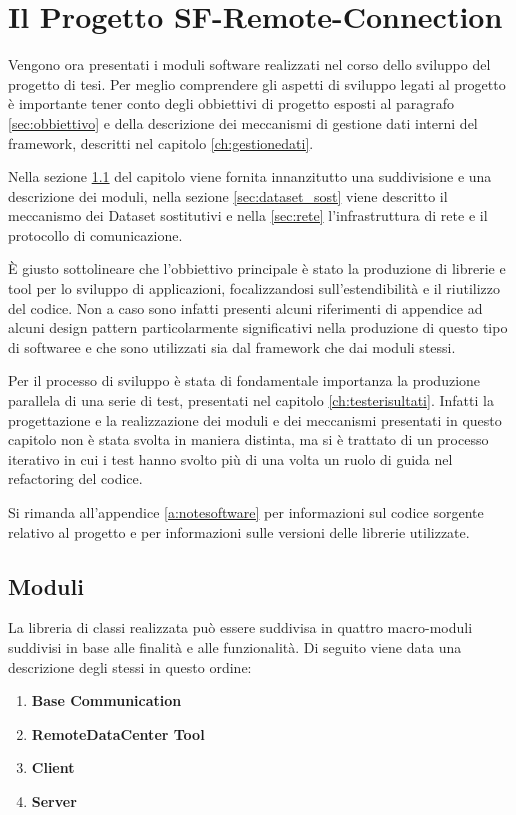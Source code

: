 
\chapter{Il Progetto SF-Remote-Connection}
\label{ch:sfremoteconnection}

Vengono ora presentati i moduli software realizzati nel corso dello sviluppo del progetto di tesi.
Per meglio comprendere gli aspetti di sviluppo legati al progetto \`e importante tener conto degli obbiettivi di progetto esposti al paragrafo \ref{sec:obbiettivo} e della descrizione dei meccanismi di gestione dati interni del framework, descritti nel capitolo \ref{ch:gestionedati}.

Nella sezione \ref{sec:moduli} del capitolo viene fornita innanzitutto una suddivisione e una descrizione dei moduli, nella sezione \ref{sec:dataset_sost} viene descritto il meccanismo dei Dataset sostitutivi e nella \ref{sec:rete} l'infrastruttura di rete e il protocollo di comunicazione.

\`E giusto sottolineare che l'obbiettivo principale \`e stato la produzione di librerie e tool per lo sviluppo di applicazioni, focalizzandosi sull'estendibilit\`a e il riutilizzo del codice. Non a caso sono infatti presenti alcuni riferimenti di appendice ad alcuni design pattern particolarmente significativi nella produzione di questo tipo di softwaree e che sono utilizzati sia dal framework che dai moduli stessi.

Per il processo di sviluppo \`e stata di fondamentale importanza la produzione parallela di una serie di test, presentati nel capitolo \ref{ch:testerisultati}. Infatti la progettazione e la realizzazione dei moduli e dei meccanismi presentati in questo capitolo non \`e stata svolta in maniera distinta, ma si \`e trattato di un processo iterativo in cui i test hanno svolto pi\`u di una volta un ruolo di guida nel refactoring del codice.

Si rimanda all'appendice \ref{a:notesoftware} per informazioni sul codice sorgente relativo al progetto e per informazioni sulle versioni delle librerie utilizzate.

\section{Moduli} 
\label{sec:moduli}
La libreria di classi realizzata pu\`o essere suddivisa in quattro macro-moduli suddivisi in base alle finalit\`a e alle funzionalit\`a.
Di seguito viene data una descrizione degli stessi in questo ordine:
\begin{enumerate}
	\item \textbf{Base Communication}
	\item \textbf{RemoteDataCenter Tool}
	\item \textbf{Client}
	\item \textbf{Server}
\end{enumerate}

